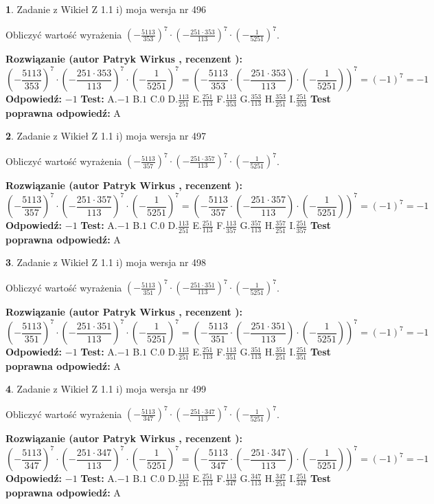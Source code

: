 \documentclass[12pt, a4paper]{article}
\theoremstyle{definition} %
\newtheorem{zad}{}
\newcommand{\zadStart}[1]{\begin{zad}#1\newline}
\newcommand{\zadStop}{\end{zad}}
\newcommand{\rozwStart}[2]{\noindent \textbf{Rozwiązanie (autor #1 , recenzent #2): }\newline}
\newcommand{\rozwStop}{\newline}
\newcommand{\odpStart}{\noindent \textbf{Odpowiedź:}\newline}
\newcommand{\odpStop}{\newline}
\newcommand{\testStart}{\noindent \textbf{Test:}\newline}
\newcommand{\testStop}{\newline}
\newcommand{\kluczStart}{\noindent \textbf{Test poprawna odpowiedź:}\newline}
\newcommand{\kluczStop}{\newline}
\begin{document}
\zadStart{Zadanie z Wikieł Z 1.1 i) moja wersja nr 496}

Obliczyć wartość wyrażenia $(-\frac{5113}{353})^{7} \cdot (-\frac{251 \cdot 353}{113})^{7} \cdot (-\frac{1}{5251})^{7}$.
\zadStop
\rozwStart{Patryk Wirkus}{}
$$(-\frac{5113}{353})^{7} \cdot (-\frac{251 \cdot 353}{113})^{7} \cdot (-\frac{1}{5251})^{7} = (-\frac{5113}{353} \cdot (-\frac{251 \cdot 353}{113}) \cdot (-\frac{1}{5251}))^{7} = (-1)^{7} = -1$$
\rozwStop
\odpStart
$-1$
\odpStop
\testStart
A.$-1$ B.$1$ C.$0$ D.$\frac{113}{251}$ E.$\frac{251}{113}$
F.$\frac{113}{353}$ G.$\frac{353}{113}$
H.$\frac{353}{251}$
I.$\frac{251}{353}$
\testStop
\kluczStart
A
\kluczStop



\zadStart{Zadanie z Wikieł Z 1.1 i) moja wersja nr 497}

Obliczyć wartość wyrażenia $(-\frac{5113}{357})^{7} \cdot (-\frac{251 \cdot 357}{113})^{7} \cdot (-\frac{1}{5251})^{7}$.
\zadStop
\rozwStart{Patryk Wirkus}{}
$$(-\frac{5113}{357})^{7} \cdot (-\frac{251 \cdot 357}{113})^{7} \cdot (-\frac{1}{5251})^{7} = (-\frac{5113}{357} \cdot (-\frac{251 \cdot 357}{113}) \cdot (-\frac{1}{5251}))^{7} = (-1)^{7} = -1$$
\rozwStop
\odpStart
$-1$
\odpStop
\testStart
A.$-1$ B.$1$ C.$0$ D.$\frac{113}{251}$ E.$\frac{251}{113}$
F.$\frac{113}{357}$ G.$\frac{357}{113}$
H.$\frac{357}{251}$
I.$\frac{251}{357}$
\testStop
\kluczStart
A
\kluczStop



\zadStart{Zadanie z Wikieł Z 1.1 i) moja wersja nr 498}

Obliczyć wartość wyrażenia $(-\frac{5113}{351})^{7} \cdot (-\frac{251 \cdot 351}{113})^{7} \cdot (-\frac{1}{5251})^{7}$.
\zadStop
\rozwStart{Patryk Wirkus}{}
$$(-\frac{5113}{351})^{7} \cdot (-\frac{251 \cdot 351}{113})^{7} \cdot (-\frac{1}{5251})^{7} = (-\frac{5113}{351} \cdot (-\frac{251 \cdot 351}{113}) \cdot (-\frac{1}{5251}))^{7} = (-1)^{7} = -1$$
\rozwStop
\odpStart
$-1$
\odpStop
\testStart
A.$-1$ B.$1$ C.$0$ D.$\frac{113}{251}$ E.$\frac{251}{113}$
F.$\frac{113}{351}$ G.$\frac{351}{113}$
H.$\frac{351}{251}$
I.$\frac{251}{351}$
\testStop
\kluczStart
A
\kluczStop



\zadStart{Zadanie z Wikieł Z 1.1 i) moja wersja nr 499}

Obliczyć wartość wyrażenia $(-\frac{5113}{347})^{7} \cdot (-\frac{251 \cdot 347}{113})^{7} \cdot (-\frac{1}{5251})^{7}$.
\zadStop
\rozwStart{Patryk Wirkus}{}
$$(-\frac{5113}{347})^{7} \cdot (-\frac{251 \cdot 347}{113})^{7} \cdot (-\frac{1}{5251})^{7} = (-\frac{5113}{347} \cdot (-\frac{251 \cdot 347}{113}) \cdot (-\frac{1}{5251}))^{7} = (-1)^{7} = -1$$
\rozwStop
\odpStart
$-1$
\odpStop
\testStart
A.$-1$ B.$1$ C.$0$ D.$\frac{113}{251}$ E.$\frac{251}{113}$
F.$\frac{113}{347}$ G.$\frac{347}{113}$
H.$\frac{347}{251}$
I.$\frac{251}{347}$
\testStop
\kluczStart
A
\kluczStop
\end{document}
